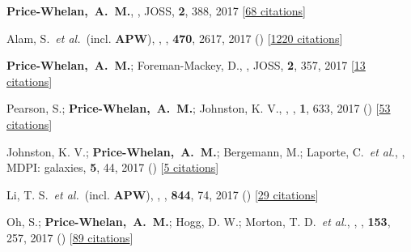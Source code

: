 \item[{\color{deemph}\scriptsize32}]\textbf{Price-Whelan,~A.~M.}, , JOSS, \textbf{2}, 388, 2017 [\href{http://adsabs.harvard.edu/abs/2017JOSS....2..388P}{68 citations}]

\item[{\color{deemph}\scriptsize31}]Alam, S.~\textit{et al.}~(incl. \textbf{APW}), , \mnras, \textbf{470}, 2617, 2017 () [\href{http://adsabs.harvard.edu/abs/2017MNRAS.470.2617A}{1220 citations}]

\item[{\color{deemph}\scriptsize30}]\textbf{Price-Whelan,~A.~M.}; Foreman-Mackey, D., , JOSS, \textbf{2}, 357, 2017 [\href{http://adsabs.harvard.edu/abs/2017JOSS....2..357P}{13 citations}]

\item[{\color{deemph}\scriptsize29}]Pearson, S.; \textbf{Price-Whelan,~A.~M.}; Johnston, K. V., , \natureast, \textbf{1}, 633, 2017 () [\href{http://adsabs.harvard.edu/abs/2017NatAs...1..633P}{53 citations}]

\item[{\color{deemph}\scriptsize28}]Johnston, K. V.; \textbf{Price-Whelan,~A.~M.}; Bergemann, M.; Laporte, C.~\textit{et al.}, , MDPI: galaxies, \textbf{5}, 44, 2017 () [\href{http://adsabs.harvard.edu/abs/2017Galax...5...44J}{5 citations}]

\item[{\color{deemph}\scriptsize27}]Li, T. S.~\textit{et al.}~(incl. \textbf{APW}), , \apj, \textbf{844}, 74, 2017 () [\href{http://adsabs.harvard.edu/abs/2017ApJ...844...74L}{29 citations}]

\item[{\color{deemph}\scriptsize26}]Oh, S.; \textbf{Price-Whelan,~A.~M.}; Hogg, D. W.; Morton, T. D.~\textit{et al.}, , \aj, \textbf{153}, 257, 2017 () [\href{http://adsabs.harvard.edu/abs/2017AJ....153..257O}{89 citations}]

